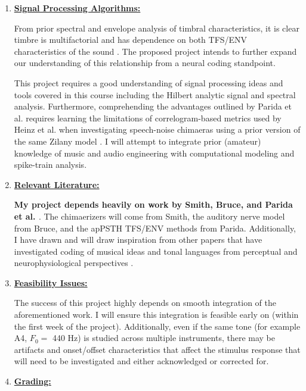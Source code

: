 \documentclass[9pt]{article}
\begin{document}
\begin{enumerate}
\item \textbf{\underline{Signal Processing Algorithms:}}

From prior spectral and envelope analysis of timbral characteristics, it is clear timbre is multifactorial and has dependence on both TFS/ENV characteristics of the sound \cite{lee_timbre_2020}. The proposed project intends to further expand our understanding of this relationship from a neural coding standpoint. 

This project requires a good understanding of signal processing ideas and tools covered in this course including the Hilbert analytic signal and spectral analysis. Furthermore, comprehending the advantages outlined by Parida et al. requires learning the limitations of correlogram-based metrics used by Heinz et al. when investigating speech-noise chimaeras using a prior version of the same Zilany model \cite{parida_spectrally_2020}. I will attempt to integrate prior (amateur) knowledge of music and audio engineering with computational modeling and spike-train analysis.   

\item \textbf{\underline{Relevant Literature:}}

\textbf{My project depends heavily on work by Smith, Bruce, and Parida et al. \cite{smith_chimaeric_2002,bruce_phenomenological_2018,parida_spectrally_2020}}. The chimaerizers will come from Smith, the auditory nerve model from Bruce, and the apPSTH TFS/ENV  methods from Parida. Additionally, I have drawn and will draw inspiration from other papers that have investigated coding of musical ideas and tonal languages from perceptual and neurophysiological perspectives \cite{manno_uncertain_2019,arnoldner_speech_2007,xu_relative_2003,riquimaroux_perception_2006,li_improved_2012,bidelman_auditory-nerve_2011}.

\item \textbf{\underline{Feasibility Issues:}}

The success of this project highly depends on smooth integration of the aforementioned work. I will ensure this integration is feasible early on (within the first week of the project). Additionally, even if the same tone (for example A4, $F_{0} = $ 440 Hz) is studied across multiple instruments, there may be artifacts and onset/offset characteristics that affect the stimulus response that will need to be investigated and either acknowledged or corrected for. 

\item \textbf{\underline{Grading: }}


\end{enumerate}
\end{document}
